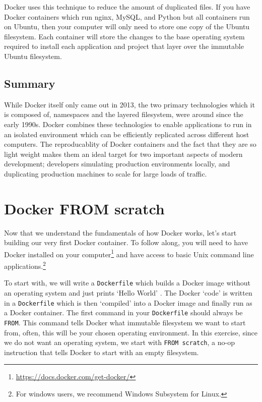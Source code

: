 Docker uses this technique to reduce the amount of duplicated files.
If you have Docker containers which run nginx, MySQL, and Python but all containers run on Ubuntu,
then your computer will only need to store one copy of the Ubuntu filesystem.
Each container will store the changes to the base operating system required to install each application and project that layer over the immutable Ubuntu filesystem.

\subsection{Summary}
While Docker itself only came out in 2013, the two primary technologies which it is composed of, namespaces and the layered filesystem,
were around since the early 1990s.
Docker combines these technologies to enable applications to run in an isolated environment which can be efficiently replicated across different host computers.
The reproducablity of Docker containers and the fact that they are so light weight makes them an ideal target for two important aspects of modern development;
developers simulating production environments locally, and duplicating production machines to scale for large loads of traffic.


\section{Docker FROM scratch}
Now that we understand the fundamentals of how Docker works, let's start building our very first Docker container.
To follow along, you will need to have Docker installed on your
computer\footnote{\url{https://docs.docker.com/get-docker/}} and have access to basic Unix command line
applications.\footnote{For windows users, we recommend Windows Subsystem for Linux.}

To start with, we will write a \texttt{Dockerfile} which builds a Docker image without an operating system and just prints `Hello World'
\cite{docker-from-scratch}.
The Docker `code' is written in a \texttt{Dockerfile} which is then `compiled' into a Docker image and finally run as a Docker container.
The first command in your \texttt{Dockerfile} should always be \texttt{FROM}.
This command tells Docker what immutable filesystem we want to start from, often, this will be your chosen operating environment.
In this exercise, since we do not want an operating system, we start with \texttt{FROM scratch},
a no-op instruction that tells Docker to start with an empty filesystem.


